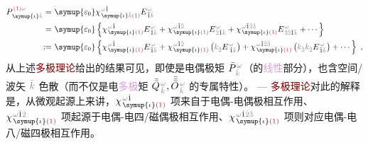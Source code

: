 \begin{subequations}
\begin{align}
	P^{\;\! \textcolor{Maroon}{(1)} \mathcolor{gray}{\omega}}_{\;\! \symup{\iota}\mathcolor{gray}{\bar{k}}} =&~ {\symup{\varepsilon_0}} \chi^{\;\! \mathcolor{gray}{\omega} \hat{1}}_{\;\! \symup{\iota} \mathcolor{gray}{\bar{k}} \textcolor{Maroon}{(1)}} E^{\;\!\mathcolor{gray}{\omega}}_{\;\! \hat{1} \mathcolor{gray}{\bar{k}}} \\ =&~ {\symup{\varepsilon_0}} \left\{ \chi^{\;\! \mathcolor{gray}{\omega} \hat{1}}_{\;\! \symup{\iota} \textcolor{Maroon}{(1)}} E^{\;\!\mathcolor{gray}{\omega}}_{\;\! \hat{1} \mathcolor{gray}{\bar{k}}} + \chi^{\;\! \mathcolor{gray}{\omega} \hat{1} \mathcolor{gray}{\hat{2}}}_{\;\! \symup{\iota} \textcolor{Maroon}{(1)}} E^{\;\!\mathcolor{gray}{\omega}}_{\;\! \mathcolor{gray}{\hat{2}} \hat{1} \mathcolor{gray}{\bar{k}}} + \chi^{\;\! \mathcolor{gray}{\omega} \hat{1} \mathcolor{gray}{\hat{2} \hat{3}}}_{\;\! \symup{\iota} \textcolor{Maroon}{(1)}} E^{\;\!\mathcolor{gray}{\omega}}_{\;\! \mathcolor{gray}{\hat{3} \hat{2}} \hat{1} \mathcolor{gray}{\bar{k}}} + \cdots \right\}  \label{eq:P(1)_wk} \\ :=&~ {\symup{\varepsilon_0}} \left\{ \chi^{\;\! \mathcolor{gray}{\omega} \hat{1}}_{\;\! \symup{\iota} \textcolor{Maroon}{(1)}} E^{\;\!\mathcolor{gray}{\omega}}_{\;\! \hat{1} \mathcolor{gray}{\bar{k}}} + \chi^{\;\! \mathcolor{gray}{\omega} \hat{1} \mathcolor{gray}{\hat{2}}}_{\;\! \symup{\iota} \textcolor{Maroon}{(1)}} \left( \mathcolor{gray}{k_{\hat{2}}} E^{\;\!\mathcolor{gray}{\omega}}_{\;\hat{1} \mathcolor{gray}{\bar{k}}} \right) + \chi^{\;\! \mathcolor{gray}{\omega} \hat{1} \mathcolor{gray}{\hat{2} \hat{3}}}_{\;\! \symup{\iota} \textcolor{Maroon}{(1)}} \left( \mathcolor{gray}{k_{\hat{3}}} \mathcolor{gray}{k_{\hat{2}}} E^{\;\!\mathcolor{gray}{\omega}}_{\;\! \hat{1} \mathcolor{gray}{\bar{k}}} \right) + \cdots \right\}~,
\end{align}
\end{subequations}
从上述\textcolor{Maroon}{多极理论}给出的结果可见，即使是电偶极矩 $\bar{P}^{\;\!\mathcolor{gray}{\omega}}_{\;\!\mathcolor{gray}{\bar{k}}}$（的\textcolor{Plum}{线性}部分），也含空间/\textcolor{PineGreen}{波矢} $\mathcolor{gray}{\bar{k}}$ \textcolor{NavyBlue}{色散}（而不仅是电\textcolor{Plum}{多极}矩 $\bar{\bar{Q}}^{\;\!\mathcolor{gray}{\omega}}_{\;\!\mathcolor{gray}{\bar{k}}},\bar{\bar{\bar{O}}}^{\;\!\mathcolor{gray}{\omega}}_{\;\!\mathcolor{gray}{\bar{k}}}$ 的专属特性）。 ---  \textcolor{Maroon}{多极理论}对此的解释是，从微观起源上来讲，$\chi^{\;\! \mathcolor{gray}{\omega} \hat{1}}_{\;\! \symup{\iota} \textcolor{Maroon}{(1)}}$ 项来自于\textcolor{NavyBlue}{电偶-电偶}极相互作用、$\chi^{\;\! \mathcolor{gray}{\omega} \hat{1} \mathcolor{gray}{\hat{2}}}_{\;\! \symup{\iota} \textcolor{Maroon}{(1)}}$ 项起源于\textcolor{NavyBlue}{电偶-电四/磁偶}极相互作用、$\chi^{\;\! \mathcolor{gray}{\omega} \hat{1} \mathcolor{gray}{\hat{2} \hat{3}}}_{\;\! \symup{\iota} \textcolor{Maroon}{(1)}}$ 项则对应\textcolor{NavyBlue}{电偶-电八/磁四}极相互作用。

